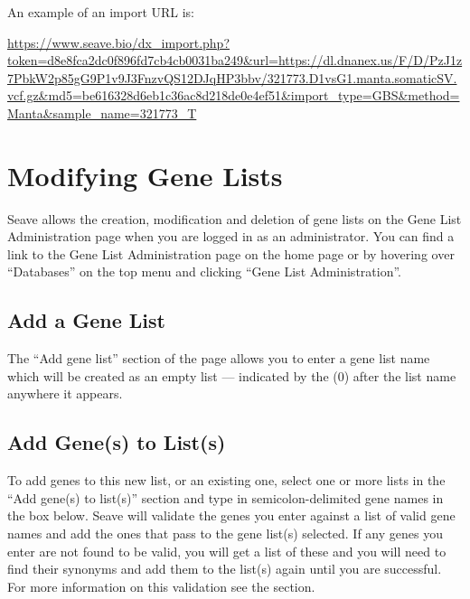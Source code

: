 \documentclass[11pt, a4paper]{article}
\begin{document}
\begin{enumerate}
	An example of an import URL is:
	
	\url{https://www.seave.bio/dx_import.php?token=d8e8fca2dc0f896fd7cb4cb0031ba249&url=https://dl.dnanex.us/F/D/PzJ1z7PbkW2p85gG9P1v9J3FnzvQS12DJqHP3bbv/321773.D1vsG1.manta.somaticSV.vcf.gz&md5=be616328d6eb1c36ac8d218de0e4ef51&import_type=GBS&method=Manta&sample_name=321773_T}
\end{enumerate}


\section{Modifying Gene Lists}

Seave allows the creation, modification and deletion of gene lists on the Gene List Administration page when you are logged in as an administrator. You can find a link to the Gene List Administration page on the home page or by hovering over ``Databases'' on the top menu and clicking ``Gene List Administration''. 


\subsection{Add a Gene List}

The ``Add gene list'' section of the page allows you to enter a gene list name which will be created as an empty list --- indicated by the (0) after the list name anywhere it appears.


\subsection{Add Gene(s) to List(s)}\label{addGenestoLists}

To add genes to this new list, or an existing one, select one or more lists in the ``Add gene(s) to list(s)'' section and type in semicolon-delimited gene names in the box below. Seave will validate the genes you enter against a list of valid gene names and add the ones that pass to the gene list(s) selected. If any genes you enter are not found to be valid, you will get a list of these and you will need to find their synonyms and add them to the list(s) again until you are successful. For more information on this validation see the  section. 
\end{document}
